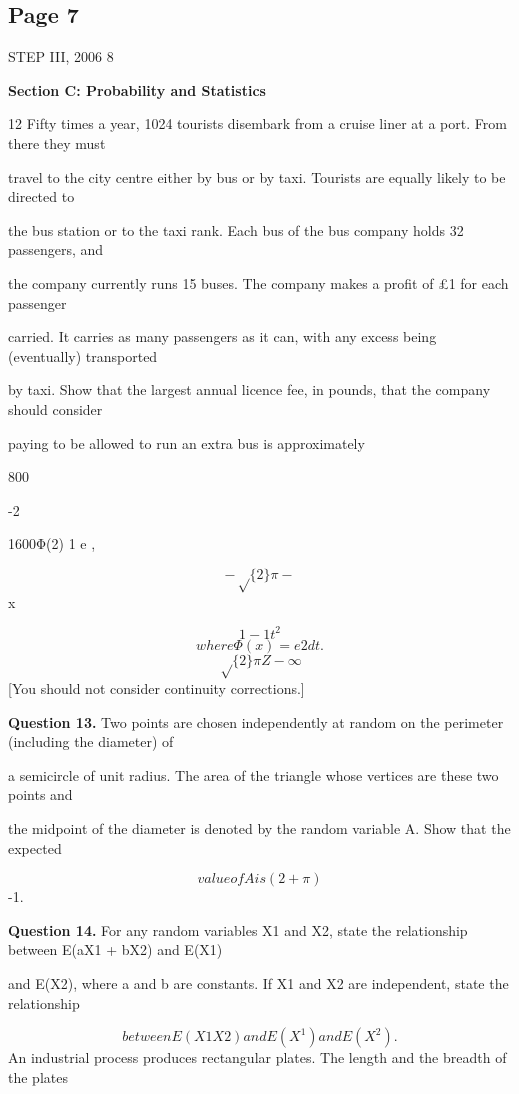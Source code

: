 \documentclass[12pt]{article}
\begin{document}
\subsection*{Page 7}
\begin{flushleft}
STEP III, 2006 8\par
\bigskip\textbf{Section C: Probability and Statistics}\par
12 Fifty times a year, 1024 tourists disembark from a cruise liner at a port. From there they must\par
travel to the city centre either by bus or by taxi. Tourists are equally likely to be directed to\par
the bus station or to the taxi rank. Each bus of the bus company holds 32 passengers, and\par
the company currently runs 15 buses. The company makes a profit of \pounds 1 for each passenger\par
carried. It carries as many passengers as it can, with any excess being (eventually) transported\par
by taxi. Show that the largest annual licence fee, in pounds, that the company should consider\par
paying to be allowed to run an extra bus is approximately\par
800\par
-2\par
1600Φ(2) 1 e ,\par
\[- \sqrt\{2\}\pi -\]
x\par
\[1 - 1 t^2\]
\[where Φ(x) = e 2 dt .\]
\[\sqrt\{2\}\pi Z-\infty\]
[You should not consider continuity corrections.]\par
\bigskip\textbf{Question 13.} Two points are chosen independently at random on the perimeter (including the diameter) of\par
a semicircle of unit radius. The area of the triangle whose vertices are these two points and\par
the midpoint of the diameter is denoted by the random variable A. Show that the expected\par
\[value of A is (2 + \pi)\]
-1.\par
\bigskip\textbf{Question 14.} For any random variables X1 and X2, state the relationship between E(aX1 + bX2) and E(X1)\par
and E(X2), where a and b are constants. If X1 and X2 are independent, state the relationship\par
\[between E(X1X2) and E(X^1) and E(X^2).\]
An industrial process produces rectangular plates. The length and the breadth of the plates\par

\end{flushleft}
\end{document}
